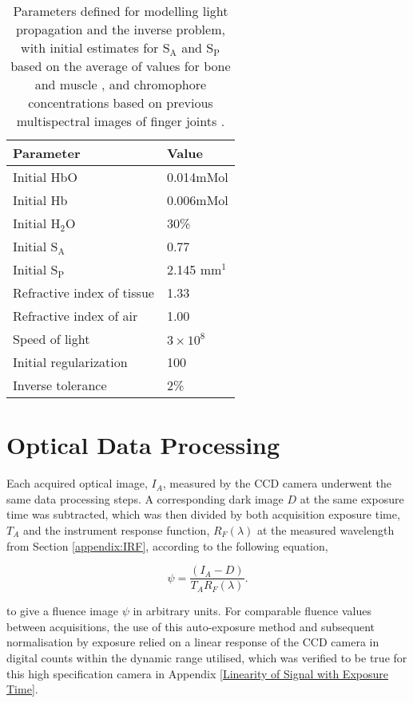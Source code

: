 \documentclass[twoside]{bhamthesis}
\theoremstyle{definition}
\begin{document}
\bgroup
\def\arraystretch{1.2}
\begin{table}[!ht]
\small
\begin{center}
 \begin{tabular}{l l} 
 \hline
 Parameter & Value\\ [0.4ex] 
 \hline
 Initial HbO &  0.014mMol \\ 
 Initial Hb & 0.006mMol \\
 Initial $\mathrm{H_2O}$ & 30\%\\
 Initial $\mathrm{S_A}$ & 0.77\\ 
 Initial $\mathrm{S_P}$ &  2.145 mm$^1$\\ 
 Refractive index of tissue & 1.33\\
 Refractive index of air & 1.00\\
 Speed of light & $3\times 10^8$\\
 Initial regularization & 100\\
 Inverse tolerance & 2\%\\
 \hline
\end{tabular}
\caption{Parameters defined for modelling light propagation and the inverse problem, with initial estimates for $\mathrm{S_A}$ and $\mathrm{S_P}$ based on the average of values for bone and muscle \cite{alexandrakis2005tomographic}, and chromophore concentrations based on previous multispectral images of finger joints \cite{yuan2010image}.}
\label{tab:ParametersTable}
\end{center}
\end{table}
\egroup



\section{Optical Data Processing}
\label{data_processing}

Each acquired optical image, $I_A$, measured by the CCD camera underwent the same data processing steps. A corresponding dark image $D$ at the same exposure time was subtracted, which was then divided by both acquisition exposure time, $T_A$ and the instrument response function, $R_F(\lambda)$ at the measured wavelength from Section \ref{appendix:IRF}, according to the following equation,

\begin{equation}
	\psi = \frac{(I_A - D)}{T_A R_F(\lambda)}.
\end{equation}

to give a fluence image $\psi$ in arbitrary units.  For comparable fluence values between acquisitions, the use of this auto-exposure method and subsequent normalisation by exposure relied on a linear response of the CCD camera in digital counts within the dynamic range utilised, which was verified to be true for this high specification camera in Appendix \ref{Linearity of Signal with Exposure Time}.
\end{document}
